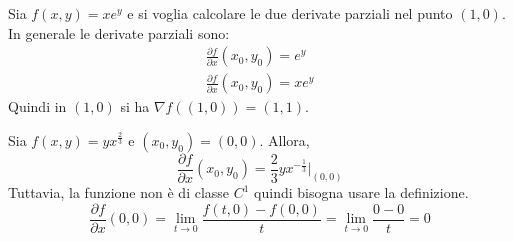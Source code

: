 \begin{example}
    Sia $f(x, y)=xe^y$ e si voglia calcolare le due derivate parziali nel punto $(1,0)$.
    In generale le derivate parziali sono:
    \begin{equation*}
        \begin{aligned}
            \frac{\partial{f}}{\partial{x}}(x_0,y_0)=e^y \\
            \frac{\partial{f}}{\partial{x}}(x_0,y_0)=xe^y
        \end{aligned}
    \end{equation*}
    Quindi in $(1,0)$ si ha $\nabla f((1,0))=(1,1)$.
\end{example}
\begin{example}
    Sia $f(x,y)= yx^{\tfrac{2}{3}}$ e $(x_0, y_0)=(0,0)$.
    Allora,
    \begin{equation*}
        \frac{\partial{f}}{\partial{x}}(x_0,y_0)= \frac{2}{3}yx^{-\tfrac{1}{3}} \Big|_{(0,0)}
    \end{equation*}
    Tuttavia, la funzione non è di classe $C^1$ quindi bisogna usare la definizione.
    \begin{equation*}
        \frac{\partial{f}}{\partial{x}}(0,0)=\lim_{t \to 0}{\frac{f(t,0)-f(0,0)}{t}}=\lim_{t \to 0}{\frac{0-0}{t}}=0
    \end{equation*}
\end{example}
